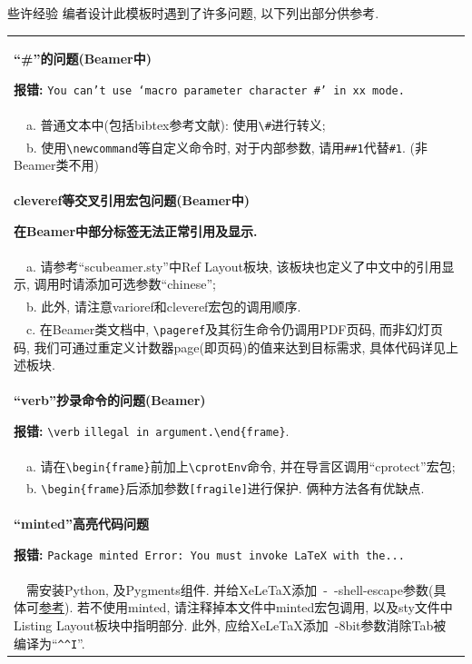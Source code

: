 \documentclass[hyperref, UTF8, CJK, aspectratio=169]{beamer}
\begin{document}
\begin{frame}[fragile]{些许经验}
	\scriptsize
	编者设计此模板时遇到了许多问题, 以下列出部分供参考.
	\begin{table}[h]
		\centering
		\begin{tabular}{>{\raggedright\arraybackslash}p{0.88\paperwidth}}
			\hline\hline
			\centerline{\textbf{``\#''的问题(Beamer中)}}
			\textbf{报错:} \texttt{You can't use `macro parameter character \#' in xx mode.}\\
			~~a. 普通文本中(包括bibtex参考文献): 使用\verb|\#|进行转义; \\
			~~b. 使用\verb|\newcommand|等自定义命令时, 对于内部参数, 请用\verb|##1|代替\verb|#1|. (非Beamer类不用)\\
			\hline
			\centerline{\textbf{cleveref等交叉引用宏包问题(Beamer中)}}
			\textbf{在Beamer中部分标签无法正常引用及显示.}\\
			~~a. 请参考``scubeamer.sty''中Ref Layout板块, 该板块也定义了中文中的引用显示, 调用时请添加可选参数``chinese'';\\
			~~b. 此外, 请注意varioref和cleveref宏包的调用顺序.\\
			~~c. 在Beamer类文档中, \verb|\pageref|及其衍生命令仍调用PDF页码, 而非幻灯页码, 我们可通过重定义计数器page(即页码)的值来达到目标需求, 具体代码详见上述板块.\\%
			\hline
			\centerline{\textbf{``verb''抄录命令的问题(Beamer)}}
			\textbf{报错:} \verb|\verb| \texttt{illegal in argument.}\verb|\end|\verb!{frame}!.\\
			~~a. 请在\verb|\begin|\verb!{frame}!前加上\verb|\cprotEnv|命令, 并在导言区调用``cprotect''宏包;\\
			~~b. \verb|\begin|\verb!{frame}!后添加参数\verb|[fragile]|进行保护. 俩种方法各有优缺点.\\
			\hline
			\centerline{\textbf{``minted''高亮代码问题}}
			\textbf{报错:} \texttt{Package minted Error: You must invoke LaTeX with the...}\\
			~~需安装Python, 及Pygments组件. 并给XeLeTaX添加~-~-shell-escape参数(具体可\href{https://blog.csdn.net/weixin_39679367/article/details/111403418/}{\color{scublue}参考}). 若不使用minted, 请注释掉本文件中minted宏包调用, 以及sty文件中Listing Layout板块中指明部分. 此外, 应给XeLeTaX添加~-8bit参数消除Tab被编译为``\verb|^^I|''.\\
			\hline\hline
		\end{tabular}
	\end{table}
\end{frame}
\end{document}
